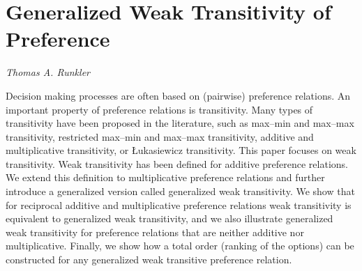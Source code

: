 \documentclass[../booklet.tex]{subfiles}
\begin{document}
\section[Generalized Weak Transitivity of Preference. {\it Thomas A. Runkler}]{Generalized Weak Transitivity of Preference}

\begin{center}
  {\it Thomas A. Runkler}
\end{center}

\vskip 0.8cm


Decision making processes are often based on 
(pairwise) preference relations.
An important property of preference relations
is transitivity.
Many types of transitivity have been proposed in the
literature, such as
max--min and max--max transitivity,
restricted max--min and max--max transitivity,
additive and multiplicative transitivity, or
{\L}ukasiewicz transitivity.
This paper focuses on weak transitivity.
Weak transitivity has been defined 
for additive preference relations.
We extend this definition to multiplicative preference 
relations and further introduce a generalized version called
generalized weak transitivity.
We show that
for reciprocal additive and multiplicative preference relations
weak transitivity is equivalent to
generalized weak transitivity,
and we also illustrate 
generalized weak transitivity
for preference relations that are neither additive nor multiplicative.
Finally,
we show how
a total order (ranking of the options) can
be constructed for any
generalized weak transitive preference relation.
\end{document}
